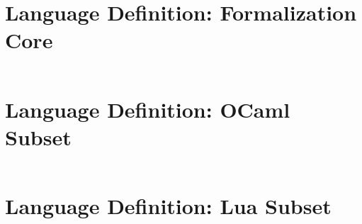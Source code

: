\documentclass{kththesis}
\begin{document}
\chapter{Language Definition: Formalization Core} \label{sec:formal-core}

\inputminted{syncon}{implementation/languages/formalization-example/core}

\chapter{Language Definition: OCaml Subset} \label{sec:appendix-ocaml}

\inputminted{syncon}{implementation/languages/ocaml/language}

\chapter{Language Definition: Lua Subset} \label{sec:appendix-lua}

\inputminted{syncon}{implementation/languages/lua/language}
\end{document}

